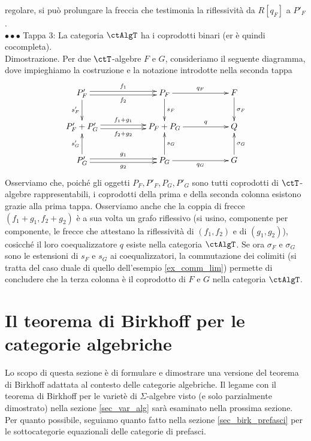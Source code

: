 \begin{exercise}
 regolare, si può prolungare la freccia che testimonia la riflessività da \(R[q_F]\) a \(P'_F\). \\
 \(\bullet\bullet\bullet\) Tappa 3:
 La categoria \(\ctAlgT\) ha i coprodotti binari (er è quindi cocompleta). \\
 Dimostrazione.
 Per due \(\ctT\)-algebre
 \(F\) e \(G\), consideriamo il seguente diagramma, dove impieghiamo la costruzione e la notazione introdotte nella seconda tappa
 \[\xymatrix{P'_F \ar@<0.5ex>[rr]^-{f_1} \ar@<-0.5ex>[rr]_-{f_2} \ar[d]_{s'_F} & & P_F \ar[rr]^-{q_F} \ar[d]^{s_F} & & F \ar[d]^{\sigma_F} \\
  P'_F + P'_G \ar@<0.5ex>[rr]^-{f_1 + g_1} \ar@<-0.5ex>[rr]_-{f_2 + g_2} & & P_F + P_G \ar[rr]^-{q} & & Q \\
  P'_G \ar@<0.5ex>[rr]^-{g_1} \ar@<-0.5ex>[rr]_-{g_2} \ar[u]^{s'_G} & & P_G \ar[rr]_-{q_G} \ar[u]_{s_G} & & G \ar[u]_{\sigma_G} }\]
 Osserviamo che, poiché gli oggetti \(P_F, P'_F, P_G, P'_G\) sono tutti coprodotti di \(\ctT\)-algebre rappresentabili, i coprodotti
 della prima e della seconda colonna esistono grazie alla prima tappa. Osserviamo anche che la coppia di frecce
 \((f_1+g_1,f_2+g_2)\) è a sua volta un grafo riflessivo (si usino, componente per componente, le frecce che attestano la riflessività
 di \((f_1,f_2)\) e di \((g_1,g_2)\)), cosicché il loro coequalizzatore \(q\) esiste nella categoria \(\ctAlgT\). Se ora \(\sigma_F\) e \(\sigma_G\)
 sono le estensioni di \(s_F\) e \(s_G\) ai coequalizzatori, la commutazione dei colimiti (si tratta del caso duale di quello dell'esempio
 \ref{ex_comm_lim}) permette di concludere che la terza colonna è il coprodotto di \(F\) e \(G\) nella categoria \(\ctAlgT\).
\end{exercise}

\section{Il teorema di Birkhoff per le categorie algebriche}\label{sec_th_Birkhoff}

Lo scopo di questa sezione è di formulare e dimostrare una versione del teorema di Birkhoff adattata al contesto delle
categorie algebriche. Il legame con il teorema di Birkhoff per le varietè di \(\Sigma\)-algebre visto (e solo parzialmente
dimostrato) nella sezione \ref{sec_var_alg} sarà esaminato nella prossima sezione. Per quanto possibile, seguiamo quanto
fatto nella sezione \ref{sec_birk_prefasci} per le sottocategorie equazionali delle categorie di prefasci.

